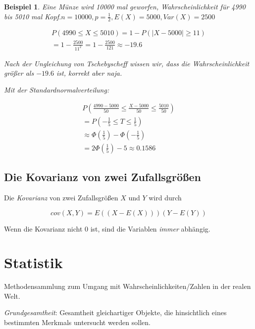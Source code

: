 \documentclass{tufte-handout}
\theoremstyle{own}
\newtheorem{example}{Beispiel}[]
\begin{document}
\begin{example}
	Eine Münze wird 10000 mal geworfen, Wahrscheinlichkeit für 4990 bis 5010 mal
	Kopf.$n=10000, p=\frac{1}{2}, E(X) = 5000, Var(X) = 2500$
	
	\begin{gather}
		P(4990 \le X \le 5010) = 1 - P(|X - 5000| \ge 11)\\
		= 1 - \frac{2500}{11^2} = 1 - \frac{2500}{121} \approx -19.6
	\end{gather}
	
	Nach der Ungleichung von Tschebyscheff wissen wir, dass die Wahrscheinlichkeit
	größer als $-19.6$ ist, korrekt aber naja.
	
	Mit der Standardnormalverteilung:
	
	\begin{gather*}
	P(\frac{4990 - 5000}{50} \le \frac{X - 5000}{50} \le \frac{5010}{50})\\
	= P(- \frac{1}{5} \le T \le \frac{1}{5}) \\
	\approx \Phi(\frac{1}{5}) - \Phi(-\frac{1}{5}) \\
	=2 \Phi(\frac{1}{5}) - 5 \approx 0.1586
	\end{gather*}
\end{example}

\subsection{Die Kovarianz von zwei Zufallsgrößen}

Die \emph{Kovarianz} von zwei Zufallsgrößen $X$ und $Y$ wird durch

\begin{equation}
	cov(X,Y) = E((X - E(X)))(Y - E(Y))
\end{equation}

Wenn die Kovarianz nicht 0 ist, sind die Variablen \emph{immer} abhängig.


\section{Statistik}

Methodensammlung zum Umgang mit Wahrscheinlichkeiten/Zahlen in der realen Welt.

\emph{Grundgesamtheit}: Gesamtheit gleichartiger Objekte, die hinsichtlich eines
bestimmten Merkmals untersucht werden sollen.
\end{document}

